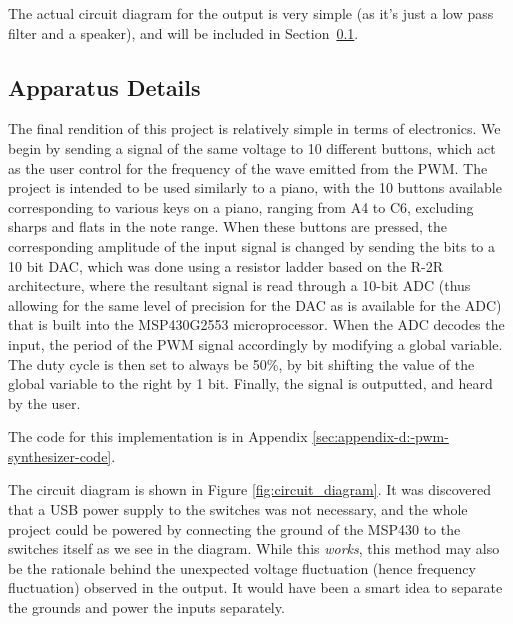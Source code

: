 The actual circuit diagram for the output is very simple (as it's just a low pass filter and a speaker), and will be included in Section~\ref{subsec:apparatus-details}.


\subsection{Apparatus Details}\label{subsec:apparatus-details}

The final rendition of this project is relatively simple in terms of electronics.
We begin by sending a signal of the same voltage to 10 different buttons, which act as the user control for the frequency of the wave emitted from the PWM\@.
The project is intended to be used similarly to a piano, with the 10 buttons available corresponding to various keys on a piano, ranging from A4 to C6, excluding sharps and flats in the note range.
When these buttons are pressed, the corresponding amplitude of the input signal is changed by sending the bits to a 10 bit DAC, which was done using a resistor ladder based on the R-2R architecture, where the resultant signal is read through a 10-bit ADC (thus allowing for the same level of precision for the DAC as is available for the ADC) that is built into the MSP430G2553 microprocessor. 
When the ADC decodes the input, the period of the PWM signal accordingly by modifying a global variable.
The duty cycle is then set to always be 50\%, by bit shifting the value of the global variable to the right by 1 bit.
Finally, the signal is outputted, and heard by the user. 

The code for this implementation is in Appendix \ref{sec:appendix-d:-pwm-synthesizer-code}. 

The circuit diagram is shown in Figure \ref{fig:circuit_diagram}. It was discovered that a USB power supply to the switches was not necessary, and the whole project could be powered by connecting the ground of the MSP430 to the switches itself as we see in the diagram. While this \textit{works}, this method may also be the rationale behind the unexpected voltage fluctuation (hence frequency fluctuation) observed in the output. It would have been a smart idea to separate the grounds and power the inputs separately. 



